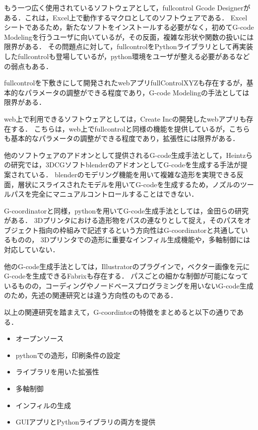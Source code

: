 \documentclass{article}
\begin{document}
\begin{twocolumn}
もう一つ広く使用されているソフトウェアとして，fullcontrol Gcode Designer\cite{gleadall2021fullcontrol}がある．これは，Excel上で動作するマクロとしてのソフトウェアである．
Excelシートであるため，新たなソフトをインストールする必要がなく，初めてG-code Modelingを行うユーザに向いているが，その反面，複雑な形状や関数の扱いには限界がある．
その問題点に対して，fullcontrolをPythonライブラリとして再実装したfullcontrol\cite{fullcontrol}も登場しているが，python環境をユーザが整える必要があるなどの弱点もある．

fullcontrolを下敷きにして開発されたwebアプリfullControlXYZ\cite{fullcontrolxyz}も存在するが，基本的なパラメータの調整ができる程度であり，G-code Modelingの手法としては限界がある．

web上で利用できるソフトウェアとしては，Create Incの開発したwebアプリ\cite{analysis230}も存在する．
こちらは，web上でfullcontrolと同様の機能を提供しているが，こちらも基本的なパラメータの調整ができる程度であり，拡張性には限界がある．

他のソフトウェアのアドオンとして提供されるG-code生成手法として，Heintzらの研究\cite{heintz}では，3DCGソフトblenderのアドオンとしてG-codeを生成する手法が提案されている．
blenderのモデリング機能を用いて複雑な造形を実現できる反面，層状にスライスされたモデルを用いてG-codeを生成するため，ノズルのツールパスを完全にマニュアルコントロールすることはできない．

G-coordinatorと同様，pythonを用いてG-code生成手法としては，金田らの研究\cite{kanada2016}がある．
3Dプリンタにおける造形物をパスの連なりとして捉え，そのパスをオブジェクト指向の枠組みで記述するという方向性はG-coordinatorと共通しているものの，
3Dプリンタでの造形に重要なインフィル生成機能や，多軸制御には対応していない．

他のG-code生成手法としては，Illustratorのプラグインで，ベクター画像を元にG-codeを生成できるFabrix\cite{fabrix}も存在する．
パスごとの細かな制御が可能になっているものの，コーディングやノードベースプログラミングを用いないG-code生成のため，先述の関連研究とは違う方向性のものである．

以上の関連研究を踏まえて，G-coordintorの特徴をまとめると以下の通りである．
\begin{itemize}
  \item オープンソース
  \item pythonでの造形，印刷条件の設定
  \item ライブラリを用いた拡張性
  \item 多軸制御
  \item インフィルの生成
  \item GUIアプリとPythonライブラリの両方を提供
  

\end{itemize}
\end{twocolumn}
\end{document}
